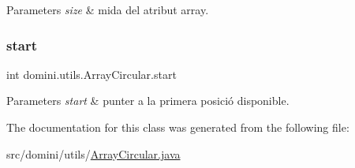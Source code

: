 \begin{DoxyParams}{Parameters}
{\em size} & mida del atribut array. \\
\hline
\end{DoxyParams}
\mbox{\label{classdomini_1_1utils_1_1ArrayCircular_a5206ac4a02c25c16c8a8ed50f65ea87b}} 
\subsubsection{\texorpdfstring{start}{start}}
{\footnotesize\ttfamily int domini.\+utils.\+Array\+Circular.\+start\hspace{0.3cm}{\ttfamily [private]}}


\begin{DoxyParams}{Parameters}
{\em start} & punter a la primera posició disponible. \\
\hline
\end{DoxyParams}


The documentation for this class was generated from the following file\+:\begin{DoxyCompactItemize}
\item 
src/domini/utils/\hyperlink{ArrayCircular_8java}{Array\+Circular.\+java}\end{DoxyCompactItemize}
